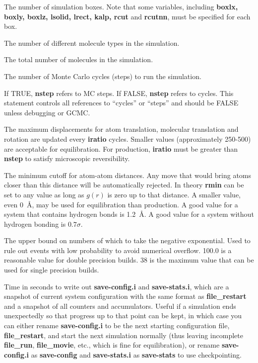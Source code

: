 \documentclass[12pt,letterpaper]{article}
\begin{document}
 The number of simulation boxes. Note
that some variables, including {\bf boxlx, boxly, boxlz,
  lsolid, lrect, kalp, rcut} and {\bf rcutnn}, must be
specified for each box.

 The number of different molecule
types in the simulation.

 The total number of molecules in the simulation.

 The number of Monte Carlo cycles
(steps) to run the simulation.

 If TRUE, {\bf nstep} refers to MC
steps. If FALSE, {\bf nstep} refers to cycles. This
statement controls all references to ``cycles'' or ``steps''
and should be FALSE unless debugging or GCMC.

 The maximum displacements for atom
translation, molecular translation and rotation are updated
every {\bf iratio} cycles. Smaller values (approximately
250-500) are acceptable for equilibration. For production,
{\bf iratio} must be greater than {\bf nstep} to satisfy
microscopic reversibility.

 The minimum cutoff for atom-atom
distances. Any move that would bring atoms closer than this
distance will be automatically rejected. In theory {\bf
  rmin} can be set to any value as long as $g(r)$ is zero up
to that distance. A smaller value, even 0~{\AA}, may be used
for equilibration than production. A good value for a system
that contains hydrogen bonds is 1.2~\AA. A good value for a
system without hydrogen bonding is $0.7\sigma$.

 The upper bound on numbers of which
to take the negative exponential. Used to rule out events
with low probability to avoid numerical overflow. 100.0 is a
reasonable value for double precision builds. 38 is the
maximum value that can be used for single precision builds.

 Time in seconds to
write out {\bf save-config.i} and {\bf save-stats.i}, which
are a snapshot of current system configuration with the same
format as {\bf file\_restart} and a snapshot of all counters
and accumulators. Useful if a simulation ends unexpectedly
so that progress up to that point can be kept, in which case
you can either rename {\bf save-config.i} to be the next
starting configuration file, {\bf file\_restart}, and start
the next simulation normally (thus leaving incomplete {\bf
  file\_run}, {\bf file\_movie}, etc., which is fine for
equilibration), or rename {\bf save-config.i} as {\bf
  save-config} and {\bf save-stats.i} as {\bf save-stats} to
use checkpointing.
\end{document}
